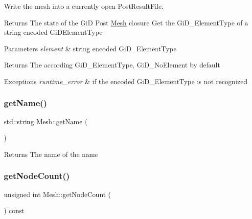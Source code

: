 Write the mesh into a currently open Post\+Result\+File. 

\begin{DoxyReturn}{Returns}
The state of the GiD Post \hyperlink{classMesh}{Mesh} closure Get the Gi\+D\+\_\+\+Element\+Type of a string encoded Gi\+D\+Element\+Type 
\end{DoxyReturn}

\begin{DoxyParams}{Parameters}
{\em element} & string encoded Gi\+D\+\_\+\+Element\+Type \\
\hline
\end{DoxyParams}
\begin{DoxyReturn}{Returns}
The according Gi\+D\+\_\+\+Element\+Type, Gi\+D\+\_\+\+No\+Element by default 
\end{DoxyReturn}

\begin{DoxyExceptions}{Exceptions}
{\em runtime\+\_\+error} & if the encoded Gi\+D\+\_\+\+Element\+Type is not recognized \\
\hline
\end{DoxyExceptions}
\mbox{\label{classMesh_a7582c53a358e1f5f85c745e8845b45a2}} 
\subsubsection{\texorpdfstring{get\+Name()}{getName()}}
{\footnotesize\ttfamily std\+::string Mesh\+::get\+Name (\begin{DoxyParamCaption}{ }\end{DoxyParamCaption})}

\begin{DoxyReturn}{Returns}
The name of the name 
\end{DoxyReturn}
\mbox{\label{classMesh_a89191e32a7f1ab3206bc9ea88be42dda}} 
\subsubsection{\texorpdfstring{get\+Node\+Count()}{getNodeCount()}}
{\footnotesize\ttfamily unsigned int Mesh\+::get\+Node\+Count (\begin{DoxyParamCaption}{ }\end{DoxyParamCaption}) const}

